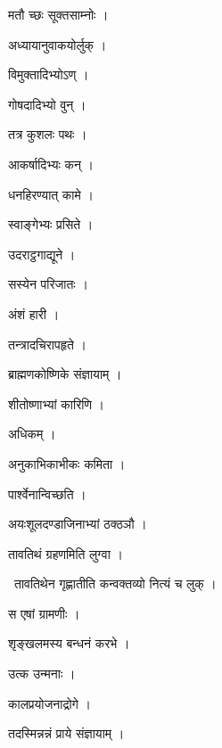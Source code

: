 \documentclass[10pt, openany, oneside]{book}
\begin{document}
\noindent मतौ च्छः सूक्तसाम्नोः ।

\noindent अध्यायानुवाकयोर्लुक् ।

\noindent विमुक्तादिभ्योऽण् ।

\noindent गोषदादिभ्यो वुन् ।

\noindent तत्र कुशलः पथः ।

\noindent आकर्षादिभ्यः कन् ।

\noindent धनहिरण्यात् कामे ।

\noindent स्वाङ्गेभ्यः प्रसिते ।

\noindent उदराट्ठगाद्यूने ।

\noindent सस्येन परिजातः ।

\noindent अंशं हारी ।

\noindent तन्त्रादचिरापहृते ।

\noindent ब्राह्मणकोष्णिके संज्ञायाम् ।

\noindent शीतोष्णाभ्यां कारिणि ।

\noindent अधिकम् ।

\noindent अनुकाभिकाभीकः कमिता ।

\noindent पार्श्वेनान्विच्छति ।

\noindent अयःशूलदण्डाजिनाभ्यां ठक्ठञौ ।

\noindent तावतिथं ग्रहणमिति लुग्वा ।

\par\noindent\hspace{1.5em}{\vps वा॰}~{\qt तावतिथेन गृह्णातीति कन्वक्तव्यो नित्यं च लुक् ।}

\noindent स एषां ग्रामणीः ।

\noindent श‍ृङ्खलमस्य बन्धनं करभे ।

\noindent उत्क उन्मनाः ।

\noindent कालप्रयोजनाद्रोगे ।

\noindent तदस्मिन्नन्नं प्राये संज्ञायाम् ।
\end{document}
